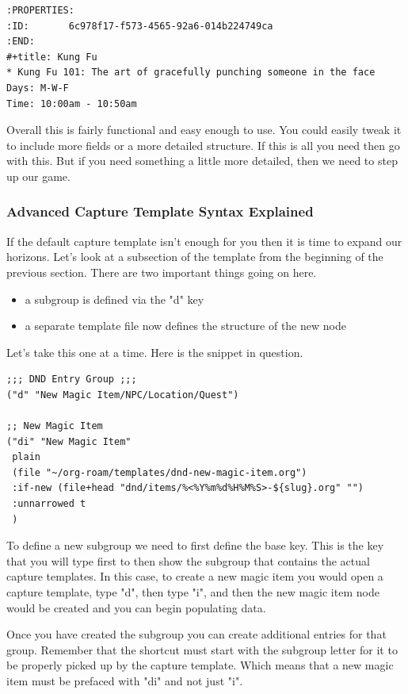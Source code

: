 \documentclass[11pt]{article}
\begin{document}
\begin{verbatim}
:PROPERTIES:
:ID:       6c978f17-f573-4565-92a6-014b224749ca
:END:
#+title: Kung Fu
* Kung Fu 101: The art of gracefully punching someone in the face
Days: M-W-F
Time: 10:00am - 10:50am
\end{verbatim}

Overall this is fairly functional and easy enough to use. You could easily tweak it to include more fields or a more detailed structure. If this is all you need then go with this. But if you need something a little more detailed, then we need to step up our game.
\subsubsection*{Advanced Capture Template Syntax Explained}
\label{sec:org573bef1}
If the default capture template isn't enough for you then it is time to expand our horizons. Let's look at a subsection of the template from the beginning of the previous section. There are two important things going on here.

\begin{itemize}
\item a subgroup is defined via the "d" key
\item a separate template file now defines the structure of the new node
\end{itemize}

Let's take this one at a time. Here is the snippet in question.

\begin{verbatim}
;;; DND Entry Group ;;;
("d" "New Magic Item/NPC/Location/Quest")

;; New Magic Item
("di" "New Magic Item"
 plain
 (file "~/org-roam/templates/dnd-new-magic-item.org")
 :if-new (file+head "dnd/items/%<%Y%m%d%H%M%S>-${slug}.org" "")
 :unnarrowed t
 )
\end{verbatim}

To define a new subgroup we need to first define the base key. This is the key that you will type first to then show the subgroup that contains the actual capture templates. In this case, to create a new magic item you would open a capture template, type "d", then type "i", and then the new magic item node would be created and you can begin populating data.

Once you have created the subgroup you can create additional entries for that group. Remember that the shortcut must start with the subgroup letter for it to be properly picked up by the capture template. Which means that a new magic item must be prefaced with "di" and not just "i".
\end{document}
